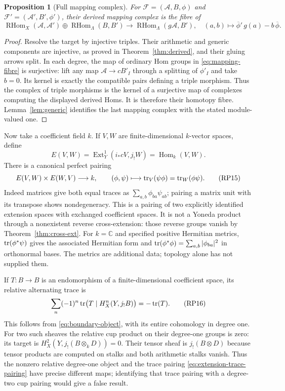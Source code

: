 \documentclass[11pt,a4paper]{article}
\newtheorem{proposition}[theorem]{Proposition}
\theoremstyle{definition}\newtheorem{definition}[theorem]{Definition}
\providecommand{\Hom}{\operatorname{Hom}}
\providecommand{\Ext}{\operatorname{Ext}}
\providecommand{\RHom}{\operatorname{RHom}}
\begin{document}
\begin{proposition}[Full mapping complex]\label{prop:mapping-complex}
For $\mathcal F=(\mathcal A,B,\phi)$ and
$\mathcal F'=(\mathcal A',B',\phi')$, their derived mapping complex is
the fibre of
\[
 \RHom_X(\mathcal A,\mathcal A')\oplus\RHom_\Lambda(B,B')
 \longrightarrow\RHom_\Lambda(g\mathcal A,B'),
 \quad (a,b)\longmapsto\overline\phi'\,g(a)-b\,\overline\phi.
 \tag{RP13}\label{eq:mapping-fibre}
\]
\end{proposition}
\begin{proof}
Resolve the target by injective triples. Their arithmetic and generic
components are injective, as proved in Theorem~\ref{thm:derived}, and
their gluing arrows split. In each degree, the map of ordinary Hom
groups in \eqref{eq:mapping-fibre} is surjective: lift any map
$\mathcal A\to cB'_I$ through a splitting of $\phi'_I$ and take $b=0$.
Its kernel is exactly the compatible pairs defining a triple morphism.
Thus the complex of triple morphisms is the kernel of a surjective
map of complexes computing the displayed derived Homs. It is therefore
their homotopy fibre. Lemma~\ref{lem:generic} identifies the last
mapping complex with the stated module-valued one.
\end{proof}

Now take a coefficient field $k$. If $V,W$ are finite-dimensional
$k$-vector spaces, define
\[
 E(V,W)=\Ext_Y^1(i_*cV,j_!W)=\Hom_k(V,W).
 \tag{RP14}\label{eq:extension-pairing-space}
\]
There is a canonical perfect pairing
\[
 E(V,W)\times E(W,V)\longrightarrow k,
 \qquad (\phi,\psi)\longmapsto\operatorname{tr}_V(\psi\phi)=\operatorname{tr}_W(\phi\psi).
 \tag{RP15}\label{eq:extension-trace-pairing}
\]
Indeed matrices give both equal traces as
$\sum_{a,b}\phi_{ba}\psi_{ab}$; pairing a matrix unit with its transpose
shows nondegeneracy. This is a pairing of two explicitly identified
extension spaces with exchanged coefficient spaces. It is not a Yoneda
product through a nonexistent reverse cross-extension: those reverse
groups vanish by Theorem~\ref{thm:cross-ext}. For $k=\mathbb C$ and
specified positive Hermitian metrics, $\operatorname{tr}(\phi^*\psi)$ gives the
associated Hermitian form and $\operatorname{tr}(\phi^*\phi)=\sum_{a,b}|\phi_{ba}|^2$
in orthonormal bases. The metrics are additional data; topology alone
has not supplied them.

If $T:B\to B$ is an endomorphism of a finite-dimensional coefficient
space, its relative alternating trace is
\[
 \sum_n(-1)^n\operatorname{tr}\bigl(T\mid H_X^n(Y,j_!B)\bigr)=-\operatorname{tr}(T).
 \tag{RP16}\label{eq:relative-trace}
\]
This follows from \eqref{eq:boundary-object}, with its entire
cohomology in degree one. For two such sheaves the relative cup product
on their degree-one groups is zero: its target is
$H_X^2(Y,j_!(B\otimes_k D))=0$. Their tensor sheaf is $j_!(B\otimes D)$
because tensor products are computed on stalks and both arithmetic
stalks vanish. Thus the nonzero relative degree-one object and the
trace pairing \eqref{eq:extension-trace-pairing} have precise different
maps; identifying that trace pairing with a degree-two cup pairing
would give a false result.
\end{document}
